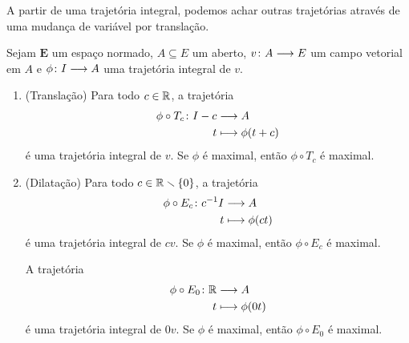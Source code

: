 A partir de uma trajetória integral, podemos achar outras trajetórias através de uma mudança de variável por translação.

\begin{proposition}
	\item \label{prop:trajetoria.integral.reparametrizada}
Sejam $\bm E$ um espaço normado, $A \subseteq E$ um aberto, $v\colon \allowbreak A \longrightarrow E$ um campo vetorial em $A$ e $\phi\colon \allowbreak I \longrightarrow A$ uma trajetória integral de $v$.
	\begin{enumerate}
	\item (Translação) Para todo $c \in \mathbb{R}$, a trajetória
		\begin{align*}
		{\phi \circ T_{c}}\colon {I-c} &\longrightarrow {A} \\{t} &\longmapsto \phi(t+c)
		\end{align*}
	é uma trajetória integral de $v$. Se $\phi$ é maximal, então $\phi \circ T_{c}$ é maximal.

	\item (Dilatação) Para todo $c \in \mathbb{R} \smallsetminus \{0\}$, a trajetória
		\begin{align*}
		{\phi \circ E_{c}}\colon {c^{-1}I} &\longrightarrow {A} \\{t} &\longmapsto \phi(ct)
		\end{align*}
	é uma trajetória integral de $cv$. Se $\phi$ é maximal, então $\phi \circ E_{c}$ é maximal.

	A trajetória
		\begin{align*}
		{\phi \circ E_{0}}\colon {\mathbb{R}} &\longrightarrow {A} \\{t} &\longmapsto \phi(0t)
		\end{align*}
	é uma trajetória integral de $0v$. Se $\phi$ é maximal, então $\phi \circ E_{0}$ é maximal.
	\end{enumerate}
\end{proposition}
